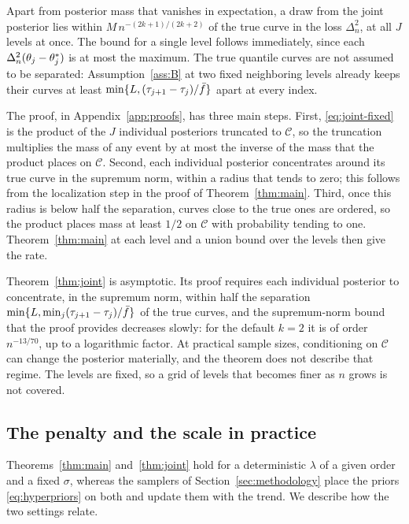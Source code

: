 Apart from posterior mass that vanishes in expectation, a draw from the joint posterior lies within $M\,n^{-(2k+1)/(2k+2)}$ of the true curve in the loss $\Delta_n^2$, at all $J$ levels at once. The bound for a single level follows immediately, since each $\Delta_n^2(\theta_j-\theta^{*}_j)$ is at most the maximum. The true quantile curves are not assumed to be separated: Assumption~\ref{ass:B} at two fixed neighboring levels already keeps their curves at least $\min\{L,(\tau_{j+1}-\tau_j)/\bar f\}$ apart at every index.

The proof, in Appendix~\ref{app:proofs}, has three main steps. First, \eqref{eq:joint-fixed} is the product of the $J$ individual posteriors truncated to $\mathcal C$, so the truncation multiplies the mass of any event by at most the inverse of the mass that the product places on $\mathcal C$. Second, each individual posterior concentrates around its true curve in the supremum norm, within a radius that tends to zero; this follows from the localization step in the proof of Theorem~\ref{thm:main}. Third, once this radius is below half the separation, curves close to the true ones are ordered, so the product places mass at least $1/2$ on $\mathcal C$ with probability tending to one. Theorem~\ref{thm:main} at each level and a union bound over the levels then give the rate.

\begin{remark}[Scope]
Theorem~\ref{thm:joint} is asymptotic. Its proof requires each individual posterior to concentrate, in the supremum norm, within half the separation $\min\{L,\min_j(\tau_{j+1}-\tau_j)/\bar f\}$ of the true curves, and the supremum-norm bound that the proof provides decreases slowly: for the default $k=2$ it is of order $n^{-13/70}$, up to a logarithmic factor. At practical sample sizes, conditioning on $\mathcal C$ can change the posterior materially, and the theorem does not describe that regime. The levels are fixed, so a grid of levels that becomes finer as $n$ grows is not covered.
\end{remark}

\subsection{The penalty and the scale in practice}\label{sec:theory-remarks}

Theorems~\ref{thm:main} and~\ref{thm:joint} hold for a deterministic $\lambda$ of a given order and a fixed $\sigma$, whereas the samplers of Section~\ref{sec:methodology} place the priors \eqref{eq:hyperpriors} on both and update them with the trend. We describe how the two settings relate.

